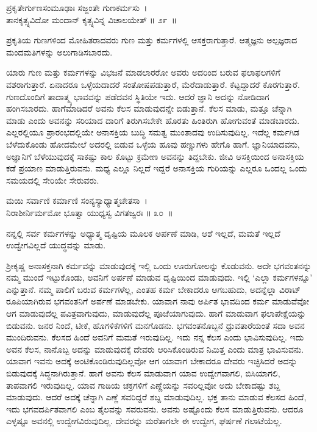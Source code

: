 \begin{shloka}
ಪ್ರಕೃತೇರ್ಗುಣಸಂಮೂಢಾಃ ಸಜ್ಜಂತೇ ಗುಣಕರ್ಮಸು~।\\ತಾನಕೃತ್ಸ್ನವಿದೋ ಮಂದಾನ್ ಕೃತ್ಸ್ನವಿನ್ನ ವಿಚಾಲಯೇತ್ \hfill॥ ೨೯~॥
\end{shloka}

\begin{artha}
ಪ್ರಕೃತಿಯ ಗುಣಗಳಿಂದ ಮೋಹಿತರಾದವರು ಗುಣ ಮತ್ತು ಕರ್ಮಗಳಲ್ಲಿ ಆಸಕ್ತರಾಗುತ್ತಾರೆ. ಆತ್ಮಜ್ಞನು ಅಲ್ಪಜ್ಞರಾದ ಮಂದಮತಿಗಳನ್ನು ಅಲುಗಾಡಿಸಬಾರದು.
\end{artha}

ಯಾರು ಗುಣ ಮತ್ತು ಕರ್ಮಗಳನ್ನು ವಿಭಜನೆ ಮಾಡಲಾರರೋ ಅವರು ಅದರಿಂದ ಬರುವ ಫಲಾಫಲಗಳಿಗೆ ವಶರಾಗುತ್ತಾರೆ. ಏನಾದರೂ ಒಳ್ಳೆಯದಾದರೆ ಸಂತೋಷಪಡುತ್ತಾರೆ, ಮೆರೆದಾಡುತ್ತಾರೆ. ಕೆಟ್ಟದ್ದಾದರೆ ಕೊರಗುತ್ತಾರೆ. ಗುಣದೊಂದಿಗೆ ತಾದಾತ್ಮ್ಯ ಭಾವವನ್ನು ಪಡೆದವನ ಸ್ಥಿತಿಯೇ ಇದು. ಆದರೆ ಜ್ಞಾನಿ ಅದನ್ನು ನೋಡಿದಾಗ ಹಂಗಿಸಬಾರದು. ಹಾಗೆಮಾಡಿದರೆ ಅವನು ಕೆಲಸ ಮಾಡುವುದನ್ನೇ ಬಿಡುತ್ತಾನೆ. ಕೆಲಸ ಮಾಡು, ಮತ್ತೂ ಚೆನ್ನಾಗಿ ಮಾಡು ಎಂದು ಅವನನ್ನು ಸರಿಯಾದ ದಾರಿಗೆ ತಿರುಗಿಸಬೇಕೇ ಹೊರತು ಹಿಂತಿರುಗಿ ಹೋಗುವಂತೆ ಮಾಡಬಾರದು. ಎಲ್ಲರಲ್ಲಿಯೂ ಪ್ರಾರಂಭದಲ್ಲಿಯೇ ಅನಾಸಕ್ತಿಯ ಬುದ್ಧಿ ಸಮತ್ವ ಮುಂತಾದವು ಉದಿಸುವುದಿಲ್ಲ. ಇದೆಲ್ಲ ಕರ್ಮಗಿಡ ಬೆಳೆದುಕೊಂಡು ಹೋದಮೇಲೆ ಅದರಲ್ಲಿ ಬಿಡುವ ಒಳ್ಳೆಯ ಹೂವು ಹಣ್ಣುಗಳು ಹೇಗೊ ಹಾಗೆ. ಜ್ಞಾನಿಯಾದವನು, ಅಜ್ಞಾನಿಗೆ ಬೆಳೆಯುವುದಕ್ಕೆ ಸಾಕಷ್ಟು ಕಾಲ ಕೊಟ್ಟು ಕ್ರಮೇಣ ಅವನನ್ನು ತಿದ್ದಬೇಕು. ಜೀವಿ ಆಸಕ್ತಿಯಿಂದ ಅನಾಸಕ್ತಿಯ ಕಡೆ ಪ್ರಯಾಣ ಮಾಡುತ್ತಿರುವನು. ಮಧ್ಯ ಎಲ್ಲೂ ನಿಲ್ಲದೆ ಇದ್ದರೆ ಅನಾಸಕ್ತಿಯ ಗುರಿಯನ್ನು ಎಲ್ಲರೂ ಒಂದಲ್ಲ ಒಂದು ಸಮಯದಲ್ಲಿ ಸೇರಿಯೇ ಸೇರುವರು.

\begin{shloka}
ಮಯಿ ಸರ್ವಾಣಿ ಕರ್ಮಾಣಿ ಸಂನ್ಯಸ್ಯಾಧ್ಯಾತ್ಮಚೇತಸಾ~।\\ನಿರಾಶೀರ್ನಿರ್ಮಮೋ ಭೂತ್ವಾ ಯುಧ್ಯಸ್ವ ವಿಗತಜ್ವರಃ \hfill॥ ೩೦~॥
\end{shloka}

\begin{artha}
ನನ್ನಲ್ಲಿ ಸರ್ವ ಕರ್ಮಗಳನ್ನು ಅಧ್ಯಾತ್ಮ ದೃಷ್ಟಿಯ ಮೂಲಕ ಅರ್ಪಣೆ ಮಾಡಿ, ಆಶೆ ಇಲ್ಲದೆ, ಮಮತೆ ಇಲ್ಲದೆ ಉದ್ವೇಗವಿಲ್ಲದೆ ಯುದ್ಧವನ್ನು ಮಾಡು.
\end{artha}

ಶ‍್ರೀಕೃಷ್ಣ ಅನಾಸಕ್ತನಾಗಿ ಕರ್ಮವನ್ನು ಮಾಡುವುದಕ್ಕೆ ಇಲ್ಲಿ ಒಂದು ಊರುಗೋಲನ್ನು ಕೊಡುವನು. ಅದೇ ಭಗವಂತನನ್ನು ನಮ್ಮ ಮುಂದೆ ಇಟ್ಟುಕೊಂಡು, ಅವನಿಗೆ ಅರ್ಪಣೆ ಮಾಡುವ ದೃಷ್ಟಿಯಿಂದ ಮಾಡುವುದು. ಇಲ್ಲಿ ‘ಎಲ್ಲಾ ಕರ್ಮಗಳನ್ನೂ’ ಎನ್ನುತ್ತಾನೆ. ನಮ್ಮ ಪಾಲಿಗೆ ಬರುವ ಕರ್ಮಗಳೆಲ್ಲ, ಎಂತಹ ಕರ್ಮ ಬೇಕಾದರೂ ಆಗಬಹುದು, ಅದನ್ನೆಲ್ಲಾ ವಿರಾಟ್ ರೂಪಿಯಾಗಿರುವ ಭಗವಂತನಿಗೆ ಅರ್ಪಣೆ ಮಾಡಬೇಕು. ಯಾವಾಗ ನಾವು ಅರ್ಪಿತ ಭಾವದಿಂದ ಕರ್ಮ ಮಾಡುವೆವೋ ಆಗ ಮಾಡುವುದೆಲ್ಲ ಪವಿತ್ರವಾಗುವುದು, ಮಾಡುವುದೆಲ್ಲ ಪೂಜೆಯಾಗುವುದು. ಹಾಗೆ ಮಾಡುವಾಗ ಫಲಾಪೇಕ್ಷೆಯನ್ನು ಬಿಡುವನು. ಜನರ ನಿಂದೆ, ಟೀಕೆ, ಹೊಗಳಿಕೆಗಳಿಗೆ ಮನಗೊಡನು. ಭಗವಂತನೊಬ್ಬನೆ ಧ್ರುವತಾರೆಯಂತೆ ಸದಾ ಅವನ ಮುಂದಿರುವನು. ಕೆಲಸದ ಹಿಂದೆ ಅವನಿಗೆ ಮಮತೆ ಇರುವುದಿಲ್ಲ. ಇದು ನನ್ನ ಕೆಲಸ ಎಂದು ಭಾವಿಸುವುದಿಲ್ಲ. ಇದು ಅವನ ಕೆಲಸ, ನಾನೊಬ್ಬ ಅದನ್ನು ಮಾಡುವುದಕ್ಕೆ ದೇವರು ಆರಿಸಿಕೊಂಡಿರುವ ನಿಮಿತ್ತ ಎಂದು ಮಾತ್ರ ಭಾವಿಸುವನು. ಯಾವಾಗ ಇವನು ಅದಕ್ಕೆ ಅಂಟಿಕೊಂಡಿರುವುದಿಲ್ಲವೋ ಆಗ ಯಾವಾಗ ಬೇಕಾದರೂ ದೇವರು ಇಚ್ಛಿಸಿದರೆ ಅದನ್ನು ಬಿಡುವುದಕ್ಕೆ ಸಿದ್ಧನಾಗಿರುತ್ತಾನೆ. ಹಾಗೆ ಅವನು ಕೆಲಸ ಮಾಡುವಾಗ ಯಾವ ಉದ್ವೇಗವಾಗಲಿ, ಬಿಸಿಯಾಗಲಿ, ತಾಪವಾಗಲಿ ಇರುವುದಿಲ್ಲ. ಯಾವ ಗಾಡಿಯ ಚಕ್ರಗಳಿಗೆ ಎಣ್ಣೆಯನ್ನು ಸವರಿಲ್ಲವೋ ಅದು ಬೇಕಾದಷ್ಟು ಶಬ್ದ ಮಾಡುವುದು. ಆದರೆ ಅದಕ್ಕೆ ಚೆನ್ನಾಗಿ ಎಣ್ಣೆ ಸವರಿದ್ದರೆ ಶಬ್ದ ಮಾಡುವುದಿಲ್ಲ. ಭಕ್ತ ತಾನು ಮಾಡುವ ಕೆಲಸದ ಹಿಂದೆ, ಇದು ಭಗವದರ್ಪಿತವಾಗಲಿ ಎಂಬ ತೈಲವನ್ನು ಸವರುವನು. ಅವನು ಅಷ್ಟೊಂದು ಕೆಲಸ ಮಾಡುತ್ತಿರುವನು. ಆದರೂ ಎಳ್ಳಷ್ಟೂ ಅವನಲ್ಲಿ ಉದ್ವೇಗವಿರುವುದಿಲ್ಲ. ದೇವರನ್ನು ಮರೆತಾಗಲೇ ಈ ಉದ್ವೇಗ, ಘರ್ಷಣೆ ಗಲಾಟೆಯೆಲ್ಲ.

